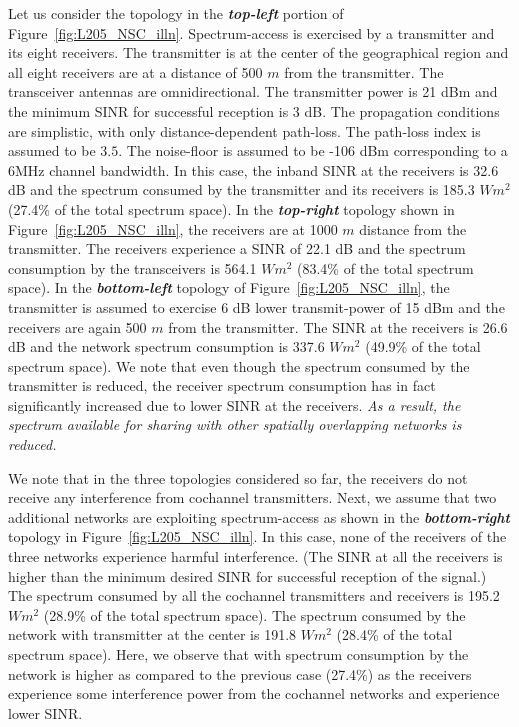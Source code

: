 \documentclass[12pt, draftclsnofoot, onecolumn]{IEEEtran}
\begin{document}
Let us consider the topology in the \textbf{\textit{top-left}} portion of Figure~\ref{fig:L205_NSC_illn}. Spectrum-access is exercised by a transmitter and its eight receivers. The transmitter is at the center of the geographical region and all eight receivers are at a distance of 500 $m$ from the transmitter. The transceiver antennas are omnidirectional. The transmitter power is 21 dBm and the minimum SINR for successful reception is 3 dB. The propagation conditions are simplistic, with only distance-dependent path-loss. The path-loss index is assumed to be $3.5$. The noise-floor is assumed to be -106 dBm corresponding to a 6MHz channel bandwidth. In this case, the inband SINR at the receivers is 32.6 dB and the spectrum consumed by the transmitter and its receivers is 185.3 $Wm^2$ (27.4\% of the total spectrum space). In the \textbf{\textit{top-right}} topology shown in Figure~\ref{fig:L205_NSC_illn}, the receivers are at 1000 $m$ distance from the transmitter. The receivers experience a SINR of 22.1 dB and the spectrum consumption by the transceivers is 564.1 $Wm^2$ (83.4\% of the total spectrum space). In the \textbf{\textit{bottom-left}} topology of Figure~\ref{fig:L205_NSC_illn}, the transmitter is assumed to exercise 6 dB lower transmit-power of 15 dBm and the receivers are again 500 $m$ from the transmitter. The SINR at the receivers is 26.6 dB and the network spectrum consumption is 337.6 $Wm^2$ (49.9\% of the total spectrum space). We note that even though the spectrum consumed by the transmitter is reduced, the receiver spectrum consumption has in fact significantly increased due to lower SINR at the receivers. \textit{As a result, the spectrum available for sharing with other spatially overlapping networks is reduced. }

We note that in the three topologies considered so far, the receivers do not receive any interference from cochannel transmitters. Next, we assume that two additional networks are exploiting spectrum-access as shown in the \textbf{\textit{bottom-right}} topology in Figure~\ref{fig:L205_NSC_illn}. In this case, none of the receivers of the three networks experience harmful interference. (The SINR at all the receivers is higher than the minimum desired SINR for successful reception of the signal.) The spectrum consumed by all the cochannel transmitters and receivers is 195.2 $Wm^2$ (28.9\% of the total spectrum space). The spectrum consumed by the network with transmitter at the center is 191.8 $Wm^2$ (28.4\% of the total spectrum space). Here, we observe that with spectrum consumption by the network is higher as compared to the previous case (27.4\%) as the receivers experience some interference power from the cochannel networks and experience lower SINR.
\end{document}
